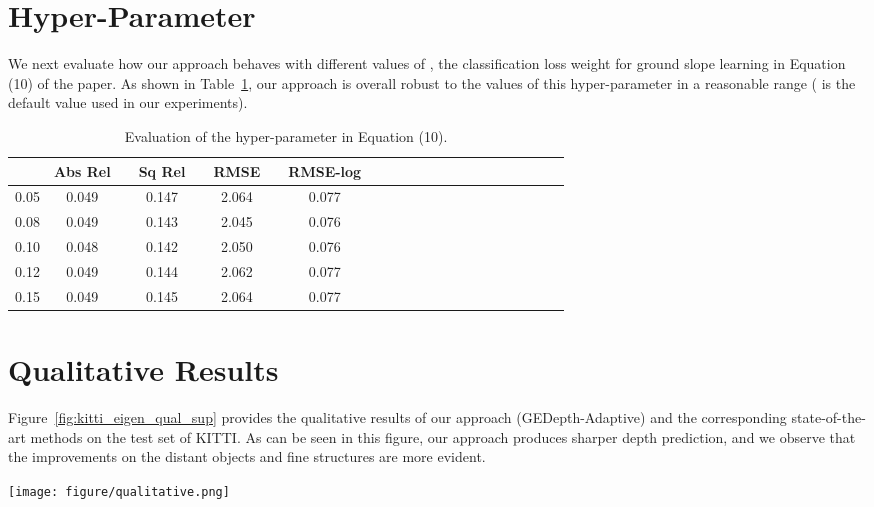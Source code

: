 \documentclass[10pt,twocolumn,letterpaper]{article}
\begin{document}
\section{Hyper-Parameter}
\label{hyper}
We next evaluate how our approach behaves with different values of , the classification loss weight for ground slope learning in Equation (10) of the paper. As shown in Table~\ref{tab:lambda}, our approach is overall robust to the values of this hyper-parameter in a reasonable range ( is the default value used in our experiments). 

\begin{table}[h]
  \small
  \centering
  \begin{tabular}{@{}lc@{}lc@{}lc@{}lc@{}lc@{}lc@{}lc@{}lc@{}lc@{}lc@{}lc@{}}
    \toprule
      &Abs Rel& &Sq Rel & &RMSE & & RMSE-log \\
    \midrule
    0.05 &0.049& & 0.147& &2.064& & 0.077& \\
    0.08  &0.049& &0.143& &2.045& & 0.076&  \\
    0.10   &0.048& & 0.142 & &2.050& &0.076&   \\
    0.12  &0.049& &0.144& &2.062& &0.077& \\
    0.15 &0.049 & &0.145& &2.064& &0.077&  \\    
    \bottomrule
  \end{tabular}
  \vspace{2mm}
  \caption{Evaluation of the hyper-parameter  in Equation (10).}
  \label{tab:lambda}
\end{table}

\section{Qualitative Results}
\label{viz}
Figure~\ref{fig:kitti_eigen_qual_sup} provides the qualitative results of our approach (GEDepth-Adaptive) and the corresponding state-of-the-art methods on the test set of KITTI. As can be seen in this figure, our approach produces sharper depth prediction, and we observe that the improvements on the distant objects and fine structures are more evident. 

\begin{figure*}
    \centering
    \texttt{[image: figure/qualitative.png]}
    \caption{Comparison of the depth prediction results by the state-of-the-art methods and our approach on three scenes of KITTI.}  
    \label{fig:kitti_eigen_qual_sup} 
\end{figure*} 
\end{document}
